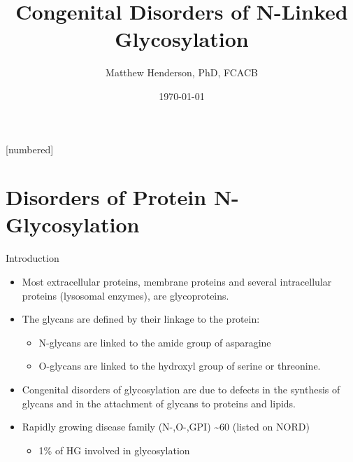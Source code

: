 \documentclass[presentation, smaller]{beamer}
\author{Matthew Henderson, PhD, FCACB}
\date{\today}
\title{Congenital Disorders of N-Linked Glycosylation}
\institute[NSO]{Newborn Screening Ontario | The University of Ottawa}
\begin{document}
\maketitle


\vspace{220pt}
\beamertemplatenavigationsymbolsempty
{}[numbered]

\section{Disorders of Protein N-Glycosylation}
\label{sec:orgd8c4958}
\begin{frame}[label={sec:org7061ec2}]{Introduction}
\begin{itemize}
\item Most extracellular proteins, membrane proteins and several
intracellular proteins (lysosomal enzymes), are glycoproteins.

\item The glycans are defined by their linkage to the protein:
\begin{itemize}
\item N-glycans are linked to the amide group of asparagine
\item O-glycans are linked to the hydroxyl group of serine or
threonine.
\end{itemize}

\item Congenital disorders of glycosylation are due to defects in the
synthesis of glycans and in the attachment of glycans to proteins
and lipids.
\item Rapidly growing disease family (N-,O-,GPI) \textasciitilde{}60 (listed on NORD)
\begin{itemize}
\item 1\% of HG involved in glycosylation
\end{itemize}
\end{itemize}
\end{frame}
\end{document}
